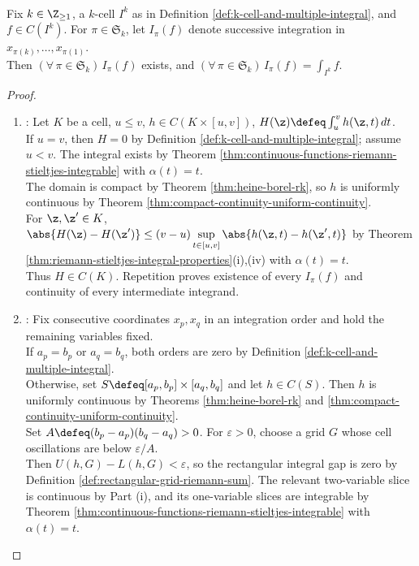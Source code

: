 \begin{theorem} \label{thm:iterated-integrals-order-independent} \\
Fix $k\in\Z_{\geq1}$, a $k$-cell $I^k$ as in Definition \ref{def:k-cell-and-multiple-integral}, and $f\in C(I^k)$. For $\pi\in\mathfrak S_k$, let $I_\pi(f)$ denote successive integration in $x_{\pi(k)},\ldots,x_{\pi(1)}$.\\
Then $(\forall\,\pi\in\mathfrak S_k)\,I_\pi(f)$ exists, and $(\forall\,\pi\in\mathfrak S_k)\,I_\pi(f)=\int_{I^k}f$.
\begin{proof}
\begin{enumerate}[label=(\roman*)]
\setlength{\itemsep}{0pt}
\item {}: Let $K$ be a cell, $u\leq v$, $h\in C(K\times[u,v])$, $H(\z)\defeq\int_u^v h(\z,t)\,dt$.\\
If $u=v$, then $H=0$ by Definition \ref{def:k-cell-and-multiple-integral}; assume $u<v$. The integral exists by Theorem \ref{thm:continuous-functions-riemann-stieltjes-integrable} with $\alpha(t)=t$.\\
The domain is compact by Theorem \ref{thm:heine-borel-rk}, so $h$ is uniformly continuous by Theorem \ref{thm:compact-continuity-uniform-continuity}.\\
For $\z,\z'\in K$, $\abs{H(\z)-H(\z')}\leq(v-u)\sup\limits_{t\in[u,v]}\abs{h(\z,t)-h(\z',t)}$ by Theorem \ref{thm:riemann-stieltjes-integral-properties}(i),(iv) with $\alpha(t)=t$.\\
Thus $H\in C(K)$. Repetition proves existence of every $I_\pi(f)$ and continuity of every intermediate integrand.
\item {}: Fix consecutive coordinates $x_p,x_q$ in an integration order and hold the remaining variables fixed.\\
If $a_p=b_p$ or $a_q=b_q$, both orders are zero by Definition \ref{def:k-cell-and-multiple-integral}.\\
Otherwise, set $S\defeq[a_p,b_p]\times[a_q,b_q]$ and let $h\in C(S)$. Then $h$ is uniformly continuous by Theorems \ref{thm:heine-borel-rk} and \ref{thm:compact-continuity-uniform-continuity}.\\
Set $A\defeq(b_p-a_p)(b_q-a_q)>0$. For $\varepsilon>0$, choose a grid $G$ whose cell oscillations are below $\varepsilon/A$.\\
Then $U(h,G)-L(h,G)<\varepsilon$, so the rectangular integral gap is zero by Definition \ref{def:rectangular-grid-riemann-sum}. The relevant two-variable slice is continuous by Part (i), and its one-variable slices are integrable by Theorem \ref{thm:continuous-functions-riemann-stieltjes-integrable} with $\alpha(t)=t$.\\

\end{enumerate}
\end{proof}
\end{theorem}
